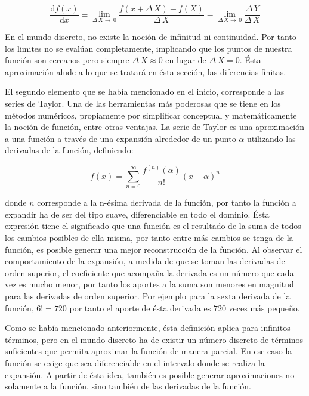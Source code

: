 \documentclass[letterpaper,10pt,oneside]{sphinxmanual}
\theoremstyle{plain}%
\theoremstyle{definition}%
\theoremstyle{remark}%
\begin{document}
\begin{equation}
\frac{\mathrm{d}f(x)}{\mathrm{d}x} \equiv \lim\limits_{\Delta\,X\rightarrow\,0}\frac{f(x + \Delta\,X) - f(X)}{\Delta\,X} = \lim\limits_{\Delta\,X\rightarrow\,0}\frac{\Delta\,Y}{\Delta\,X}
\end{equation}

En el mundo discreto, no existe la noción de infinitud ni continuidad. Por tanto los limites no se evalúan completamente, implicando que los puntos de nuestra función son cercanos pero siempre $\Delta\,X\approx0$ en lugar de $\Delta\,X=0$. Ésta aproximación alude a lo que se tratará en ésta sección, las diferencias finitas.\medskip

El segundo elemento que se había mencionado en el inicio, corresponde a las series de Taylor. Una de las herramientas más poderosas que se tiene en los métodos numéricos, propiamente por simplificar conceptual y matemáticamente la noción de función, entre otras ventajas. La serie de Taylor es una aproximación a una función a través de una expansión alrededor de un punto $\alpha$ utilizando las derivadas de la función, definiendo:

\begin{equation}
f(x) = \sum\limits_{n=0}^{\infty}\frac{f^{(n)}(\alpha)}{n!}(x-\alpha)^n
\end{equation}

donde $n$ corresponde a la n-ésima derivada de la función, por tanto la función a expandir ha de ser del tipo suave, diferenciable en todo el dominio. Ésta expresión tiene el significado que una función es el resultado de la suma de todos los cambios posibles de ella misma, por tanto entre más cambios se tenga de la función, es posible generar una mejor reconstrucción de la función. Al observar el comportamiento de la expansión, a medida de que se toman las derivadas de orden superior, el coeficiente que acompaña la derivada es un número que cada vez es mucho menor, por tanto los aportes a la suma son menores en magnitud para las derivadas de orden superior. Por ejemplo para la sexta derivada de la función, $6! = 720$ por tanto el aporte de ésta derivada es $720$ veces más pequeño.

Como se había mencionado anteriormente, ésta definición aplica para infinitos términos, pero en el mundo discreto ha de existir un número discreto de términos suficientes que permita aproximar la función de manera parcial. En ese caso la función se exige que sea diferenciable en el intervalo donde se realiza la expansión. A partir de ésta idea, también es posible generar aproximaciones no solamente a la función, sino también de las derivadas de la función.
\end{document}
